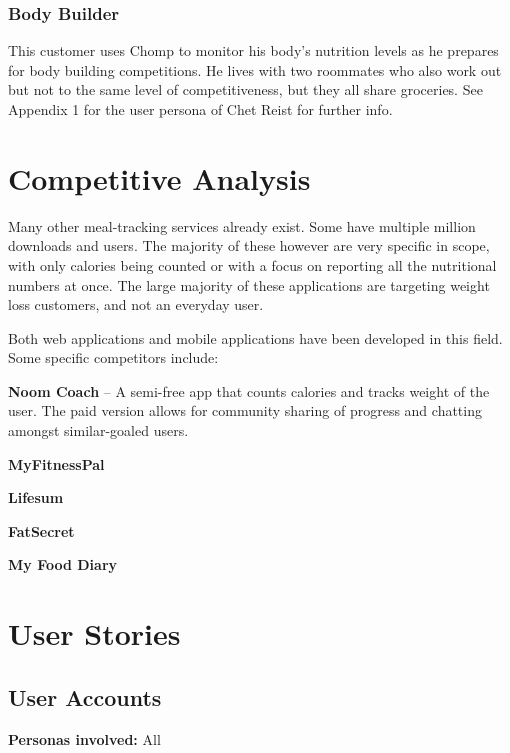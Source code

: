 \documentclass[a4paper,12pt]{article}
\begin{document}
\subsubsection*{Body Builder}
This customer uses Chomp to monitor his body's nutrition levels as he prepares for body building competitions.  He lives with two roommates who also work out but not to the same level of competitiveness, but they all share groceries.  See Appendix 1 for the user persona of Chet Reist for further info.
\section*{Competitive Analysis}
Many other meal-tracking services already exist.  Some have multiple million downloads and users.  The majority of these however are very specific in scope, with only calories being counted or with a focus on reporting all the nutritional numbers at once.  The large majority of these applications are targeting weight loss customers, and not an everyday user.

Both web applications and mobile applications have been developed in this field.  Some specific competitors include: \begin{list}{•}{•}
\item \textbf{Noom Coach} -- A semi-free app that counts calories and tracks weight of the user.  The paid version allows for community sharing of progress and chatting amongst similar-goaled users.
\item \textbf{MyFitnessPal}
\item \textbf{Lifesum}
\item \textbf{FatSecret}
\item \textbf{My Food Diary}
\end{list}
\section*{User Stories}
\subsection{User Accounts}
\textbf{Personas involved:} All
\end{document}
